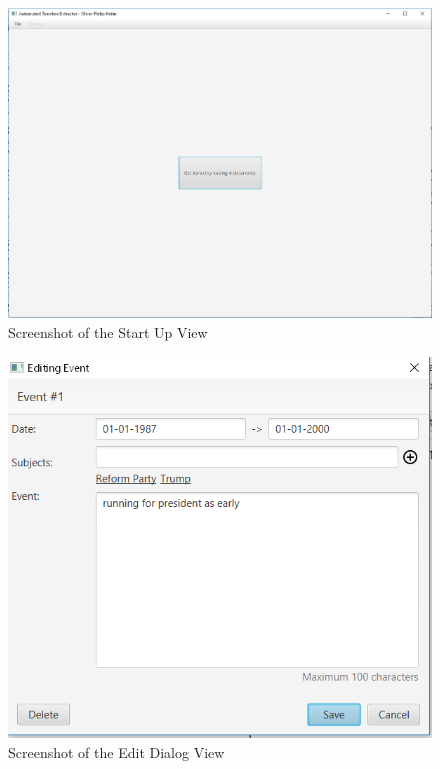 \begin{figure}[h]
\caption{Screenshot of the Start Up View}
\label{fig:startUpImplemented}
\includegraphics[width=\linewidth]{startUpImplemented.png}
\centering
\end{figure}
\begin{figure}[h]
\caption{Screenshot of the Edit Dialog View}
\label{fig:editDialogImplemented}
\includegraphics[width=\linewidth]{editDialogImplemented.png}
\centering
\end{figure}
